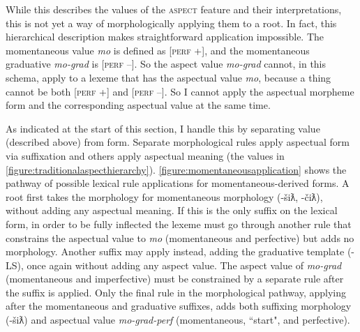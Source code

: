 \begin{figure}[H]
\begin{footnotesize}
\end{footnotesize}
\end{figure}

\newpage

While this describes the values of the \textsc{aspect} feature and their interpretations, this is not yet a way of morphologically applying them to a root. In fact, this hierarchical description makes straightforward application impossible. The momentaneous value \textit{mo} is defined as [\textsc{perf} +], and the momentaneous graduative \textit{mo-grad} is [\textsc{perf} --]. So the aspect value \textit{mo-grad} cannot, in this schema, apply to a lexeme that has the aspectual value \textit{mo}, because a thing cannot be both [\textsc{perf} +] and [\textsc{perf} --]. So I cannot apply the aspectual morpheme form and the corresponding aspectual value at the same time.

As indicated at the start of this section, I handle this by separating value (described above) from form. Separate morphological rules apply aspectual form via suffixation and others apply aspectual meaning (the values in \cref{figure:traditionalaspecthierarchy}). \cref{figure:momentaneousapplication} shows the pathway of possible lexical rule applications for momentaneous-derived forms. A root first takes the morphology for momentaneous morphology (-šiƛ, -čiƛ), without adding any aspectual meaning. If this is the only suffix on the lexical form, in order to be fully inflected the lexeme must go through another rule that constrains the aspectual value to \textit{mo} (momentaneous and perfective) but adds no morphology. Another suffix may apply instead, adding the graduative template (-LS), once again without adding any aspect value. The aspect value of \textit{mo-grad} (momentaneous and imperfective) must be constrained by a separate rule after the suffix is applied. Only the final rule in the morphological pathway, applying after the momentaneous and graduative suffixes, adds both suffixing morphology (-šiƛ) and aspectual value \textit{mo-grad-perf} (momentaneous, ``start", and perfective).

